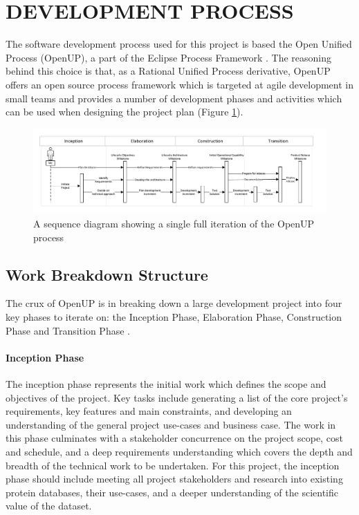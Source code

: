\section{DEVELOPMENT PROCESS \hrulefill}

The software development process used for this project is based the Open Unified
Process (OpenUP), a part of the Eclipse Process Framework \cite{EclipseND}. The
reasoning behind this choice is that, as a Rational Unified Process derivative,
OpenUP offers an open source process framework which is targeted at agile
development in small teams and provides a number of development phases and
activities which can be used when designing the project plan (Figure
\ref{fig:sequence-openup}).

\begin{figure}[H]
\centering
\includegraphics[width=7.5in]{assets/sequence-openup.pdf}
\caption{A sequence diagram showing a single full iteration of the OpenUP
  process}
\label{fig:sequence-openup}
\end{figure}

\subsection{Work Breakdown Structure}
The crux of OpenUP is in breaking down a large development project into four key
phases to iterate on: the Inception Phase, Elaboration Phase, Construction Phase
and Transition Phase \cite{Rational2011}.

\paragraph{Inception Phase} The inception phase represents the initial work
which defines the scope and objectives of the project. Key tasks include
generating a list of the core project's requirements, key features and main
constraints, and developing an understanding of the general project use-cases
and business case. The work in this phase culminates with a stakeholder
concurrence on the project scope, cost and schedule, and a deep requirements
understanding which covers the depth and breadth of the technical work to be
undertaken. For this project, the inception phase should include meeting all
project stakeholders and research into existing protein databases, their
use-cases, and a deeper understanding of the scientific value of the dataset.

